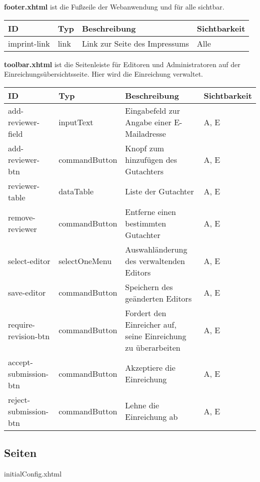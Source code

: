 \textbf{footer.xhtml} ist die Fußzeile der Webanwendung und für alle sichtbar.

\begin{tabular}[H]{|m{2cm}|m{3cm}|m{6cm}|m{2.5cm}|}
	\hline
	\textbf{ID} & \textbf{Typ} & \textbf{Beschreibung} & \textbf{Sichtbarkeit} \\
	\hline
	\hline
	imprint-link & link & Link zur Seite des Impressums & Alle\\
	\hline
\end{tabular}

\begin{samepage} %

\textbf{toolbar.xhtml} ist die Seitenleiste für Editoren und Administratoren auf der Einreichungsübersichtsseite. Hier wird die Einreichung verwaltet.
\nopagebreak

\begin{tabular}[H]{|m{2cm}|m{3cm}|m{6cm}|m{2.5cm}|}
	\hline
	\textbf{ID} & \textbf{Typ} & \textbf{Beschreibung} & \textbf{Sichtbarkeit} \\
	\hline
	\hline
	add-reviewer-field & inputText & Eingabefeld zur Angabe einer E-Mailadresse & A, E \\
	\hline
	add-reviewer-btn & commandButton & Knopf zum hinzufügen des Gutachters & A, E \\
	\hline
	reviewer-table & dataTable & Liste der Gutachter & A, E \\
	\hline
	remove-reviewer & commandButton & Entferne einen bestimmten Gutachter & A, E \\
	\hline
	select-editor & selectOneMenu & Auswahländerung des verwaltenden Editors & A, E \\
	\hline
	save-editor & commandButton & Speichern des geänderten Editors & A, E \\
	\hline
	require-revision-btn & commandButton & Fordert den Einreicher auf, seine Einreichung zu überarbeiten & A, E \\
	\hline
	accept-submission-btn & commandButton & Akzeptiere die Einreichung & A, E \\
	\hline
	reject-submission-btn & commandButton & Lehne die Einreichung ab & A, E \\
	\hline
\end{tabular}

\end{samepage}

\subsection{Seiten}
initialConfig.xhtml

